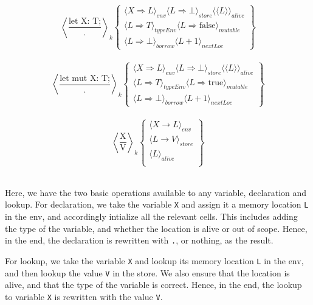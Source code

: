\documentclass[review,twocolumn]{sigplanconf}
\begin{document}
\begin{footnotesize}
  \[
    \left\langle
    \frac{ \text{let X: T;} }{ . }
    \right\rangle _k
    \left\{
    \begin{array}{l}
      \langle X \Rightarrow L\rangle_{env} \langle L \Rightarrow \bot\rangle_{store}  \langle\langle L \rangle\rangle_{alive} \\
      \langle L \Rightarrow T\rangle_{typeEnv} \langle L \Rightarrow \text{false} \rangle_{mutable}                           \\
      \langle L \Rightarrow \bot\rangle_{borrow} \langle L + 1 \rangle_{nextLoc}
    \end{array}
    \right\}
  \]
  \\
  \[
    \left\langle
    \frac{ \text{let mut X: T;} }{ . }
    \right\rangle _k
    \left\{
    \begin{array}{l}
      \langle X \Rightarrow L\rangle_{env} \langle L \Rightarrow \bot\rangle_{store} \langle\langle L \rangle\rangle_{alive} \\
      \langle L \Rightarrow T\rangle_{typeEnv} \langle L \Rightarrow \text{true} \rangle_{mutable}                           \\
      \langle L \Rightarrow \bot\rangle_{borrow} \langle L + 1 \rangle_{nextLoc}
    \end{array}
    \right\}
  \]
  \\
  \[
    \left\langle
    \frac{ \text{X} }{ \text{V} }
    \right\rangle _k
    \left\{
    \begin{array}{l}
      \langle X \rightarrow L\rangle_{env}   \\
      \langle L \rightarrow V\rangle_{store} \\
      \langle L \rangle_{alive}              \\
    \end{array}
    \right\}
  \]
  \\
\end{footnotesize}

Here, we have the two basic operations available to any variable, declaration and lookup. For declaration, we take the variable \verb!X! and assign it a memory location \verb!L! in the env, and accordingly intialize all the relevant cells. This includes adding the type of the variable, and whether the location is alive or out of scope. Hence, in the end, the declaration is rewritten with \verb!.!, or nothing, as the result.

For lookup, we take the variable \verb!X! and lookup its memory location \verb!L! in the env, and then lookup the value \verb!V! in the store. We also ensure that the location is alive, and that the type of the variable is correct. Hence, in the end, the lookup to variable \verb!X! is rewritten with the value \verb!V!.
\end{document}
